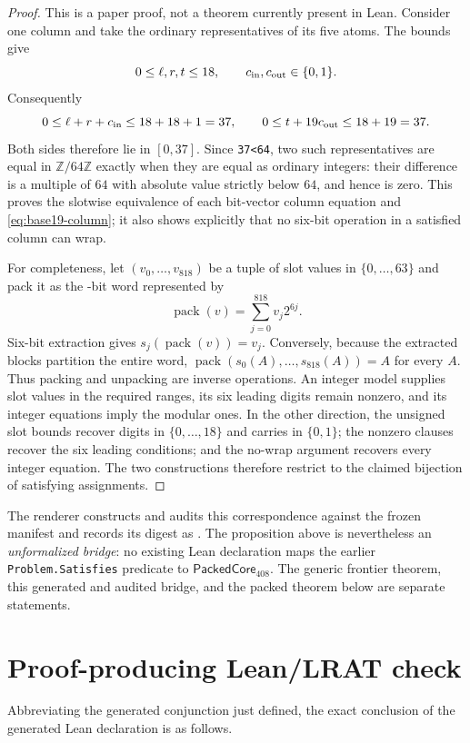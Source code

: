 \documentclass[11pt,twoside]{article}
\theoremstyle{remark}
\begin{document}
\begin{proof}
This is a paper proof, not a theorem currently present in Lean.  Consider one
column and take the ordinary representatives of its five atoms.  The bounds
give
\[
  0\leq \ell,r,t\leq18,
  \qquad c_{\rm in},c_{\rm out}\in\{0,1\}.
\]
Consequently
\[
  0\leq\ell+r+c_{\rm in}\leq18+18+1=37,
  \qquad
  0\leq t+19c_{\rm out}\leq18+19=37.
\]
Both sides therefore lie in $[0,37]$.  Since \texttt{37<64}, two such
representatives are equal in $\mathbb Z/64\mathbb Z$ exactly when they are
equal as ordinary integers: their difference is a multiple of $64$ with
absolute value strictly below $64$, and hence is zero.  This proves the
slotwise equivalence of each bit-vector column equation and
\cref{eq:base19-column}; it also shows explicitly that no six-bit operation
in a satisfied column can wrap.

For completeness, let $(v_0,\ldots,v_{818})$ be a tuple of slot values in
$\{0,\ldots,63\}$ and pack it as the \PackedWidth-bit word represented by
\[
  \operatorname{pack}(v)=\sum_{j=0}^{818}v_j2^{6j}.
\]
Six-bit extraction gives
$s_j(\operatorname{pack}(v))=v_j$.  Conversely, because the extracted blocks
partition the entire word,
$\operatorname{pack}(s_0(A),\ldots,s_{818}(A))=A$ for every $A$.  Thus
packing and unpacking are inverse operations.  An integer model supplies
slot values in the required ranges, its six leading digits remain nonzero,
and its integer equations imply the modular ones.  In the other direction,
the unsigned slot bounds recover digits in $\{0,\ldots,18\}$ and carries in
$\{0,1\}$; the nonzero clauses recover the six leading conditions; and the
no-wrap argument recovers every integer equation.  The two constructions
therefore restrict to the claimed bijection of satisfying assignments.
\end{proof}

The renderer constructs and audits this correspondence against the frozen
manifest and records its digest as \PackedManifestSha.  The proposition above
is nevertheless an \emph{unformalized bridge}: no existing Lean declaration
maps the earlier \texttt{Problem.Satisfies} predicate to
$\mathsf{PackedCore}_{408}$.  The generic frontier theorem, this generated
and audited bridge, and the packed theorem below are separate statements.

\section{Proof-producing Lean/LRAT check}
\label{sec:lean-lrat}
Abbreviating the generated conjunction just defined, the exact conclusion of
the generated Lean declaration is as follows.
\end{document}
